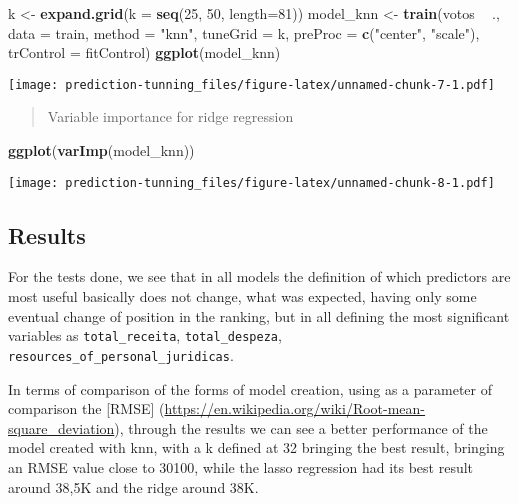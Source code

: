\documentclass[]{article}
\newenvironment{Shaded}{\begin{snugshade}}{\end{snugshade}}
\newcommand{\KeywordTok}[1]{\textcolor[rgb]{0.13,0.29,0.53}{\textbf{#1}}}
\newcommand{\DataTypeTok}[1]{\textcolor[rgb]{0.13,0.29,0.53}{#1}}
\newcommand{\DecValTok}[1]{\textcolor[rgb]{0.00,0.00,0.81}{#1}}
\newcommand{\StringTok}[1]{\textcolor[rgb]{0.31,0.60,0.02}{#1}}
\newcommand{\OperatorTok}[1]{\textcolor[rgb]{0.81,0.36,0.00}{\textbf{#1}}}
\newcommand{\NormalTok}[1]{#1}
\begin{document}
\begin{Shaded}
\begin{Highlighting}[]
\NormalTok{k <-}\StringTok{ }\KeywordTok{expand.grid}\NormalTok{(}\DataTypeTok{k =} \KeywordTok{seq}\NormalTok{(}\DecValTok{25}\NormalTok{, }\DecValTok{50}\NormalTok{, }\DataTypeTok{length=}\DecValTok{81}\NormalTok{))}
\NormalTok{model_knn <-}\StringTok{ }\KeywordTok{train}\NormalTok{(votos }\OperatorTok{~}\StringTok{ }\NormalTok{., }
                     \DataTypeTok{data =}\NormalTok{ train, }
                     \DataTypeTok{method =} \StringTok{"knn"}\NormalTok{, }
                     \DataTypeTok{tuneGrid =}\NormalTok{ k,}
                     \DataTypeTok{preProc =} \KeywordTok{c}\NormalTok{(}\StringTok{"center"}\NormalTok{, }\StringTok{"scale"}\NormalTok{),}
                     \DataTypeTok{trControl =}\NormalTok{ fitControl)}
\KeywordTok{ggplot}\NormalTok{(model_knn)}
\end{Highlighting}
\end{Shaded}

\texttt{[image: prediction-tunning\_files/figure-latex/unnamed-chunk-7-1.pdf]}

\begin{quote}
Variable importance for ridge regression
\end{quote}

\begin{Shaded}
\begin{Highlighting}[]
\KeywordTok{ggplot}\NormalTok{(}\KeywordTok{varImp}\NormalTok{(model_knn))}
\end{Highlighting}
\end{Shaded}

\texttt{[image: prediction-tunning\_files/figure-latex/unnamed-chunk-8-1.pdf]}

\subsection{Results}\label{results}

For the tests done, we see that in all models the definition of which
predictors are most useful basically does not change, what was expected,
having only some eventual change of position in the ranking, but in all
defining the most significant variables as \texttt{total\_receita},
\texttt{total\_despeza}, \texttt{resources\_of\_personal\_juridicas}.

In terms of comparison of the forms of model creation, using as a
parameter of comparison the {[}RMSE{]}
(\url{https://en.wikipedia.org/wiki/Root-mean-square_deviation}),
through the results we can see a better performance of the model created
with knn, with a k defined at 32 bringing the best result, bringing an
RMSE value close to 30100, while the lasso regression had its best
result around 38,5K and the ridge around 38K.
\end{document}
